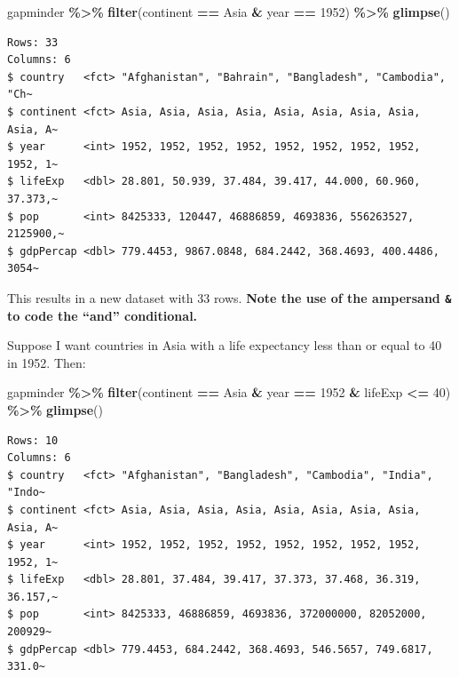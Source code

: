 \documentclass[
]{book}
\makeatletter
\newenvironment{Shaded}{\begin{snugshade}}{\end{snugshade}}
\newcommand{\DecValTok}[1]{\textcolor[rgb]{0.06,0.06,0.06}{#1}}
\newcommand{\FunctionTok}[1]{\textcolor[rgb]{0.27,0.27,0.27}{\textbf{#1}}}
\newcommand{\NormalTok}[1]{#1}
\newcommand{\SpecialCharTok}[1]{\textcolor[rgb]{0.43,0.43,0.43}{\textbf{#1}}}
\newcommand{\StringTok}[1]{\textcolor[rgb]{0.5,0.5,0.5}{#1}}
\newenvironment{kframe}{%
\medskip{}
\setlength{\fboxsep}{.8em}
 \def\at@end@of@kframe{}%
 \ifinner\ifhmode%
  \def\at@end@of@kframe{\end{minipage}}%
  \begin{minipage}{\columnwidth}%
 \fi\fi%
 \def\FrameCommand##1{\hskip\@totalleftmargin \hskip-\fboxsep
 \colorbox{shadecolor}{##1}\hskip-\fboxsep
     \hskip-\linewidth \hskip-\@totalleftmargin \hskip\columnwidth}%
 \MakeFramed {\advance\hsize-\width
   \@totalleftmargin\z@ \linewidth\hsize
   \@setminipage}}%
 {\par\unskip\endMakeFramed%
 \at@end@of@kframe}
\renewenvironment{Shaded}{\begin{kframe}}{\end{kframe}}
\makeatother
\begin{document}
\begin{Shaded}
\begin{Highlighting}[]
\NormalTok{gapminder }\SpecialCharTok{\%\textgreater{}\%} 
  \FunctionTok{filter}\NormalTok{(continent }\SpecialCharTok{==} \StringTok{\textquotesingle{}Asia\textquotesingle{}} \SpecialCharTok{\&}\NormalTok{ year }\SpecialCharTok{==} \DecValTok{1952}\NormalTok{) }\SpecialCharTok{\%\textgreater{}\%} 
  \FunctionTok{glimpse}\NormalTok{()}
\end{Highlighting}
\end{Shaded}

\begin{verbatim}
Rows: 33
Columns: 6
$ country   <fct> "Afghanistan", "Bahrain", "Bangladesh", "Cambodia", "Ch~
$ continent <fct> Asia, Asia, Asia, Asia, Asia, Asia, Asia, Asia, Asia, A~
$ year      <int> 1952, 1952, 1952, 1952, 1952, 1952, 1952, 1952, 1952, 1~
$ lifeExp   <dbl> 28.801, 50.939, 37.484, 39.417, 44.000, 60.960, 37.373,~
$ pop       <int> 8425333, 120447, 46886859, 4693836, 556263527, 2125900,~
$ gdpPercap <dbl> 779.4453, 9867.0848, 684.2442, 368.4693, 400.4486, 3054~
\end{verbatim}

This results in a new dataset with 33 rows. \textbf{Note the use of the ampersand \texttt{\&} to code the ``and'' conditional.}

Suppose I want countries in Asia with a life expectancy less than or equal to 40 in 1952. Then:

\begin{Shaded}
\begin{Highlighting}[]
\NormalTok{gapminder }\SpecialCharTok{\%\textgreater{}\%} 
  \FunctionTok{filter}\NormalTok{(continent }\SpecialCharTok{==} \StringTok{\textquotesingle{}Asia\textquotesingle{}} \SpecialCharTok{\&}\NormalTok{ year }\SpecialCharTok{==} \DecValTok{1952} \SpecialCharTok{\&}\NormalTok{ lifeExp }\SpecialCharTok{\textless{}=} \DecValTok{40}\NormalTok{) }\SpecialCharTok{\%\textgreater{}\%} 
  \FunctionTok{glimpse}\NormalTok{()}
\end{Highlighting}
\end{Shaded}

\begin{verbatim}
Rows: 10
Columns: 6
$ country   <fct> "Afghanistan", "Bangladesh", "Cambodia", "India", "Indo~
$ continent <fct> Asia, Asia, Asia, Asia, Asia, Asia, Asia, Asia, Asia, A~
$ year      <int> 1952, 1952, 1952, 1952, 1952, 1952, 1952, 1952, 1952, 1~
$ lifeExp   <dbl> 28.801, 37.484, 39.417, 37.373, 37.468, 36.319, 36.157,~
$ pop       <int> 8425333, 46886859, 4693836, 372000000, 82052000, 200929~
$ gdpPercap <dbl> 779.4453, 684.2442, 368.4693, 546.5657, 749.6817, 331.0~
\end{verbatim}
\end{document}
